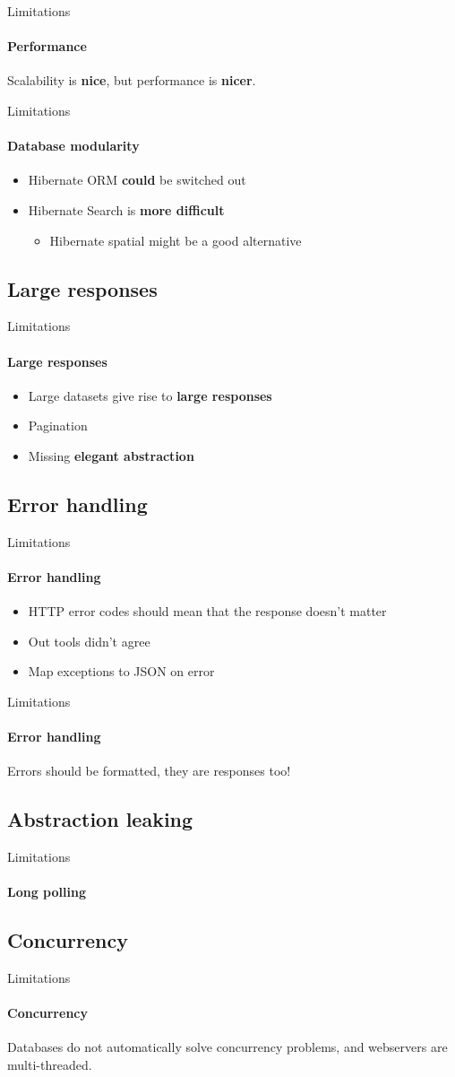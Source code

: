 \begin{frame}{Limitations}
	\framesubtitle{Performance}
	Scalability is \textbf{nice}, but performance is \textbf{nicer}.
\end{frame}

\begin{frame}{Limitations}
	\framesubtitle{Database modularity}
	\begin{itemize}
		\item Hibernate ORM \textbf{could} be switched out
		\item Hibernate Search is \textbf{more difficult}
			\begin{itemize}
				\item Hibernate spatial might be a good alternative
			\end{itemize}
	\end{itemize}
\end{frame}

\subsection{Large responses}
\begin{frame}{Limitations}
	\framesubtitle{Large responses}
	\begin{itemize}
		\item Large datasets give rise to \textbf{large responses}
		\item Pagination
		\item Missing \textbf{elegant abstraction}
	\end{itemize}
\end{frame}

\subsection{Error handling}
\begin{frame}{Limitations}
	\framesubtitle{Error handling}
	\begin{itemize}
		\item HTTP error codes should mean that the response doesn't matter
		\item Out tools didn't agree
		\item Map exceptions to JSON on error
	\end{itemize}
\end{frame}

\begin{frame}{Limitations}
	\framesubtitle{Error handling}
	Errors should be formatted, they are responses too!
\end{frame}

\subsection{Abstraction leaking}
\begin{frame}{Limitations}
	\framesubtitle{Long polling}
\end{frame}

\subsection{Concurrency}
\begin{frame}{Limitations}
	\framesubtitle{Concurrency}
	Databases do not automatically solve concurrency problems, and webservers are multi-threaded.
\end{frame}
